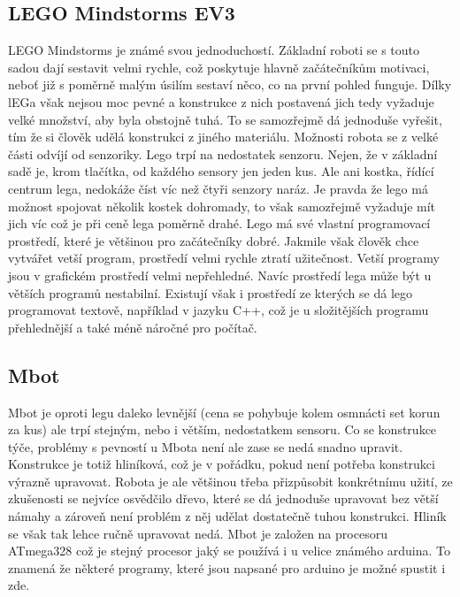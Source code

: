 \documentclass{template/socthesis}
\begin{document}
\subsection{LEGO Mindstorms EV3}
LEGO Mindstorms je známé svou jednoduchostí. Základní roboti se s touto sadou dají sestavit velmi rychle, což poskytuje hlavně začátečníkům motivaci, neboť již s poměrně malým úsilím sestaví něco, co na první pohled funguje. Dílky lEGa však nejsou moc pevné a konstrukce z nich postavená jich tedy vyžaduje velké množství, aby byla obstojně tuhá. To se samozřejmě dá jednoduše vyřešit, tím že si člověk udělá konstrukci z jiného materiálu. 
Možnosti robota se z velké části odvíjí od senzoriky. Lego trpí na nedostatek senzoru. Nejen, že v základní sadě je, krom tlačítka, od každého sensory jen jeden kus. Ale ani kostka, řídící centrum lega, nedokáže číst víc než čtyři senzory naráz. Je pravda že lego má možnost spojovat několik kostek dohromady, to však samozřejmě vyžaduje mít jich víc což je při ceně lega poměrně drahé.
Lego má své vlastní programovací prostředí, které je většinou pro začátečníky dobré. Jakmile však člověk chce vytvářet vetší program, prostředí velmi rychle ztratí užitečnost. Vetší programy jsou v grafickém prostředí velmi nepřehledné. Navíc prostředí lega může být u větších programů nestabilní. Existují však i prostředí ze kterých se dá lego programovat textově, například v jazyku C++, což je u složitějších programu přehlednější a také méně náročné pro počítač.

\subsection{Mbot}
Mbot je oproti legu daleko levnější (cena se pohybuje kolem osmnácti set korun za kus) ale trpí stejným, nebo i větším, nedostatkem sensoru. Co se konstrukce týče, problémy s pevností u Mbota není ale zase se nedá snadno upravit. Konstrukce je totiž hliníková, což je v pořádku, pokud není potřeba konstrukci výrazně upravovat. Robota je ale většinou třeba přizpůsobit konkrétnímu užití, ze zkušenosti se nejvíce osvědčilo dřevo, které se dá jednoduše upravovat bez větší námahy a zároveň není problém z něj udělat dostatečně tuhou konstrukci. Hliník se však tak lehce ručně upravovat nedá.
Mbot je založen na procesoru ATmega328 což je stejný procesor jaký se používá i u velice známého arduina. To znamená že některé programy, které jsou napsané pro arduino je možné spustit i zde.
\end{document}
